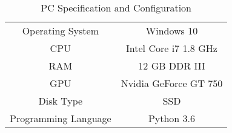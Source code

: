 \begin{table}[t!]
    \centering
    \caption{PC Specification and Configuration}
    \label{table:pc}
    \begin{tabular} {c c}
        \toprule
        Operating System & Windows 10\\
        CPU & Intel Core i7 1.8 GHz\\
        RAM & 12 GB DDR III\\
        GPU & Nvidia GeForce GT 750\\
        Disk Type & SSD\\
        Programming Language & Python 3.6 \\
        \bottomrule %
    \end{tabular}
\end{table}

